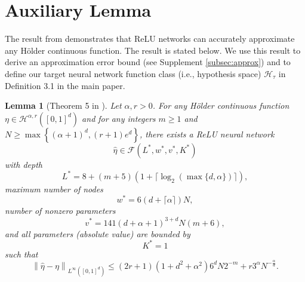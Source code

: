 \documentclass{article}
\newtheorem{lemma}{Lemma}
\newtheorem{remark}{Remark}
\begin{document}
\section{Auxiliary Lemma}\label{append:lemma}
The result from \citep{schmidt2020nonparametric} demonstrates that ReLU networks can accurately approximate any H\"older continuous function.
The result is stated below.
We use this result to derive an approximation error bound (see Supplement \ref{subsec:approx}) and to define our target neural network function class (i.e., hypothesis space) $\mathcal{H}_\tau$ in Definition 3.1 in the main paper. 
\begin{lemma}[Theorem 5 in \citep{schmidt2020nonparametric}]\label{schmidt}
    Let $\alpha, r>0$. For any Hölder continuous function $\eta \in \mathcal{H}^{\alpha,r}([0,1]^d)$ and for any integers $m\geq 1$ and \\$N \geq \max \left\{(\alpha +1)^d, (r+1)e^d\right\}$, 
    there exists a ReLU neural network 
    \begin{equation*}
        \widehat{\eta} \in \mathcal{F}(L^*, w^*, v^*,K^*)
    \end{equation*} with depth $$L^*= 8+ (m+5)(1+\lceil \log_2(\max\{d,\alpha\}) \rceil),$$  
    maximum number of nodes $$w^* = 6(d+ \lceil \alpha \rceil )N,$$ 
    number of nonzero parameters $$v^*= 141 (d+\alpha +1)^{3+d}N (m+6) ,$$ and all parameters (absolute value) are bounded by $$K^*= 1$$
    such that
    \begin{equation}\label{schmidt_error}
        \left\|\widehat{\eta} -\eta\right\|_{L^\infty([0,1]^d)}\leq (2r+1)(1+d^2 + \alpha^2)6^d N 2^{-m} + r3^\alpha N^{-\frac{\alpha}{d}}. 
    \end{equation}
\end{lemma}
\begin{comment}
\begin{remark}
    We note that the width of the network in the above Lemma is exponentially dependent on dimension $d$ as $N= \Omega ( \max\{\alpha^d,e^d\})$, whereas the total number of nonzero parameters is $v^* = \mathcal{O} \left((d+\alpha)^{3+d}\right)$. Analogously, the bound on the approximation error of $ \widehat{\eta}$ in \eqref{schmidt_error} is dependent on $d$ exponentially. However, \citet[Theorem 3.1]{suh2022approximation} has proven that such exponential dependence in $d$ can be avoided in the approximation error bound under two scenarios: (1) $\alpha= \mathcal{O}(d) $ and any integer $N\geq 1$ or (2) $\alpha = \mathcal{O} (1) $ and $N= \mathcal{O}(d^d) $. 
    Furthermore, it is stated in the proof of \citet[Theorem 5]{schmidt2020nonparametric} that all network parameters are bounded by $1$ in absolute value.
    \end{remark}
\end{comment}
\end{document}
